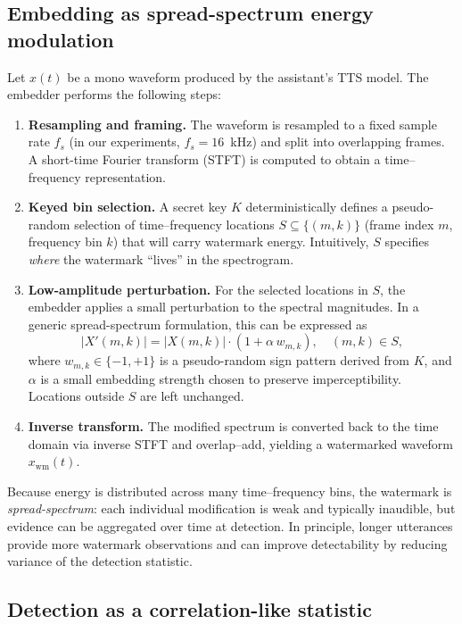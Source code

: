 \subsection{Embedding as spread-spectrum energy modulation}
\label{subsec:wm-embed}

Let $x(t)$ be a mono waveform produced by the assistant's TTS model. The
embedder performs the following steps:

\begin{enumerate}
    \item \textbf{Resampling and framing.} The waveform is resampled to a fixed
    sample rate $f_s$ (in our experiments, $f_s=16$~kHz) and split into
    overlapping frames. A short-time Fourier transform (STFT) is computed to
    obtain a time--frequency representation.
    \item \textbf{Keyed bin selection.} A secret key $K$ deterministically
    defines a pseudo-random selection of time--frequency locations
    $S \subseteq \{(m,k)\}$ (frame index $m$, frequency bin $k$) that will carry
    watermark energy. Intuitively, $S$ specifies \emph{where} the watermark
    ``lives'' in the spectrogram.
    \item \textbf{Low-amplitude perturbation.} For the selected locations in
    $S$, the embedder applies a small perturbation to the spectral magnitudes.
    In a generic spread-spectrum formulation, this can be expressed as
    \[
        |X'(m,k)| = |X(m,k)| \cdot (1 + \alpha \, w_{m,k}), \quad (m,k)\in S,
    \]
    where $w_{m,k}\in\{-1,+1\}$ is a pseudo-random sign pattern derived from
    $K$, and $\alpha$ is a small embedding strength chosen to preserve
    imperceptibility. Locations outside $S$ are left unchanged.
    \item \textbf{Inverse transform.} The modified spectrum is converted back
    to the time domain via inverse STFT and overlap--add, yielding a watermarked
    waveform $x_{\mathrm{wm}}(t)$.
\end{enumerate}

Because energy is distributed across many time--frequency bins, the watermark
is \emph{spread-spectrum}: each individual modification is weak and typically
inaudible, but evidence can be aggregated over time at detection. In principle,
longer utterances provide more watermark observations and can improve
detectability by reducing variance of the detection statistic.

\subsection{Detection as a correlation-like statistic}
\label{subsec:wm-detect}

